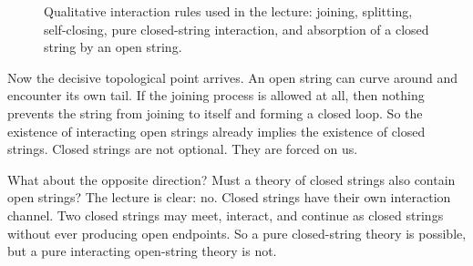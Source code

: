 \begin{figure}[t]
\centering
{}
\caption{Qualitative interaction rules used in the lecture: joining, splitting, self-closing, pure closed-string interaction, and absorption of a closed string by an open string.}
\end{figure}

Now the decisive topological point arrives. An open string can curve around and encounter its own tail. If the joining process is allowed at all, then nothing prevents the string from joining to itself and forming a closed loop. So the existence of interacting open strings already implies the existence of closed strings. Closed strings are not optional. They are forced on us.

What about the opposite direction? Must a theory of closed strings also contain open strings? The lecture is clear: no. Closed strings have their own interaction channel. Two closed strings may meet, interact, and continue as closed strings without ever producing open endpoints. So a pure closed-string theory is possible, but a pure interacting open-string theory is not.


